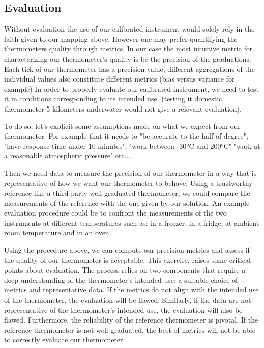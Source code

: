 \begin{bibunit}
\subsection*{Evaluation}

Without evaluation the use of our calibrated instrument would solely rely in the faith given to our mapping above.
However one may prefer quantifying the thermometers quality through metrics.
In our case the most intuitive metric for characterizing our thermometer's quality is be the precision of the graduations.
Each tick of our thermometer has a precision value, different aggregations of the individual values also constitute different metrics (bias versus variance for example)
In order to properly evaluate our calibrated instrument, we need to test it in conditions corresponding to its intended use. (testing it domestic thermometer 5 kilometers underwater would not give a relevant evaluation).

 To do so, let's explicit some assumptions made on what we expect from our thermometer.
  For example that it needs to "be accurate to the half of degree", "have response time under 10 minutes", "work between -30°C and 200°C" "work at a reasonable atmospheric pressure" etc...

Then we need data to measure the precision of our thermometer in a way that is representative of how we want our thermometer to behave. Using a trustworthy reference like a third-party well-graduated thermometer, we could compare the measurements of the reference with the one given by our solution.
  An example evaluation procedure could be to confront the measurements of the two instruments at different temperatures such as: in a freezer, in a fridge, at ambient room temperature and in an oven.

Using the procedure above, we can compute our precision metrics and assess if the quality of our thermometer is acceptable.
This exercise, raises some critical points about evaluation. The process relies on two components that require a deep understanding of the thermometer's intended use: a suitable choice of metrics and representative data.
If the metrics do not align with the intended use of the thermometer, the evaluation will be flawed. Similarly, if the data are not representative of the thermometer's intended use, the evaluation will also be flawed.
 Furthermore, the reliability of the reference thermometer is pivotal. If the reference thermometer is not well-graduated, the best of metrics will not be able to correctly evaluate our thermometer. 


\end{bibunit}
